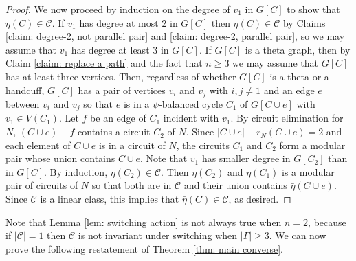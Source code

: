 \documentclass[12pt]{article}
\theoremstyle{definition}
\newcommand{\cC}{\mathcal{C}}
\begin{document}
\begin{proof}
We now proceed by induction on the degree of $v_1$ in $G[C]$ to show that $\bar\eta(C) \in \cC$.
If $v_1$ has degree at most $2$ in $G[C]$ then $\bar\eta(C) \in \cC$ by Claims \ref{claim: degree-2, not parallel pair} and \ref{claim: degree-2, parallel pair}, so we may assume that $v_1$ has degree at least $3$ in $G[C]$.
If $G[C]$ is a theta graph, then by Claim \ref{claim: replace a path} and the fact that $n \ge 3$ we may assume that $G[C]$ has at least three vertices.
Then, regardless of whether $G[C]$ is a theta or a handcuff,
$G[C]$ has a pair of vertices $v_i$ and $v_j$ with $i,j \ne 1$ and an edge $e$ between $v_i$ and $v_j$ so that $e$ is in a $\psi$-balanced cycle $C_1$ of $G[C \cup e]$ with $v_1 \in V(C_1)$.
Let $f$ be an edge of $C_1$ incident with $v_1$.
By circuit elimination for $N$, $(C \cup e) - f$ contains a circuit $C_2$ of $N$.
Since $|C \cup e| - r_N(C \cup e) = 2$ and each element of $C \cup e$ is in a circuit of $N$, the circuits $C_1$ and $C_2$ form a modular pair whose union contains $C \cup e$.
Note that $v_1$ has smaller degree in $G[C_2]$ than in $G[C]$.
By induction, $\bar\eta(C_2) \in \cC$.
Then $\bar\eta(C_2)$ and $\bar\eta(C_1)$ is a modular pair of circuits of $N$ so that both are in $\cC$ and their union contains $\bar\eta(C \cup e)$.
Since $\cC$ is a linear class, this implies that $\bar\eta(C) \in \cC$, as desired.
\end{proof}


Note that Lemma \ref{lem: switching action} is not always true when $n = 2$, because if $|\cC| = 1$ then $\cC$ is not invariant under switching when $|\Gamma| \ge 3$.
We can now prove the following restatement of Theorem \ref{thm: main converse}.
\end{document}
